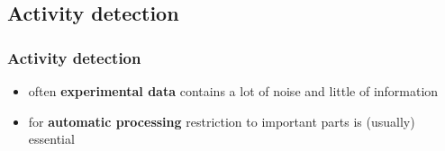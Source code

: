 
\subsection{Activity detection}

\begin{frame} %
	\frametitle{Activity detection}
	\begin{itemize}
		\item often \textbf{experimental data} contains a lot of noise and little of information
		\item for \textbf{automatic processing} restriction to important parts is (usually) essential
	\end{itemize}
\end{frame}


